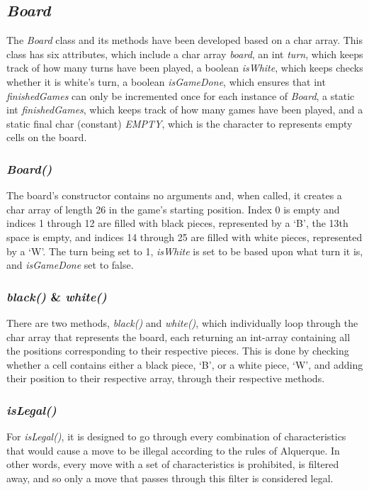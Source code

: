 \documentclass[12pt, a4paper]{article}
\begin{document}
\subsection{\emph{Board}}
The \emph{Board} class and its methods have been developed based on a char array. This class has six attributes, which include a char array \emph{board}, an int \emph{turn}, which keeps track of how many turns have been played, a boolean \emph{isWhite}, which keeps checks whether it is white’s turn, a boolean \emph{isGameDone}, which ensures that int \emph{finishedGames} can only be incremented once for each instance of \emph{Board}, a static int \emph{finishedGames}, which keeps track of how many games have been played, and a static final char (constant) \emph{EMPTY}, which is the character to represents empty cells on the board.

\subsubsection{\emph{Board()}}
The board's constructor contains no arguments and, when called, it creates a char array of length 26 in the game's starting position. Index 0 is empty and indices 1 through 12 are filled with black pieces, represented by a ‘B’, the 13th space is empty, and indices 14 through 25 are filled with white pieces, represented by a ‘W’. The turn being set to 1, \emph{isWhite} is set to be based upon what turn it is, and \emph{isGameDone} set to false. 

\subsubsection{\emph{black()} \& \emph{white()}}
There are two methods, \emph{black()} and \emph{white()}, which individually loop through the char array that represents the board, each returning an int-array containing all the positions corresponding to their respective pieces. This is done by checking whether a cell contains either a black piece, ‘B’, or a white piece, ‘W’, and adding their position to their respective array, through their respective methods.

\subsubsection{\emph{isLegal()}}
For \emph{isLegal()}, it is designed to go through every combination of characteristics that would cause a move to be illegal according to the rules of Alquerque. In other words, every move with a set of characteristics is prohibited, is filtered away, and so only a move that passes through this filter is considered legal.
\end{document}
